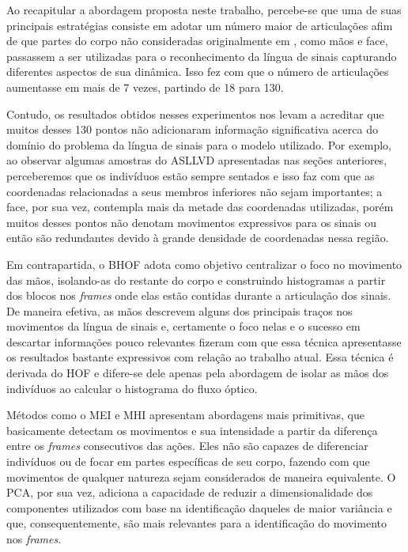 

Ao recapitular a abordagem proposta neste trabalho, percebe-se que uma de suas principais estratégias consiste em adotar um número maior de articulações afim de que partes do corpo não consideradas originalmente em \cite{st-gcn-2018}, como mãos e face, passassem a ser utilizadas para o reconhecimento da língua de sinais capturando diferentes aspectos de sua dinâmica. Isso fez com que o número de articulações aumentasse em mais de 7 vezes, partindo de 18 para 130. 

Contudo, os resultados obtidos nesses experimentos nos levam a acreditar que muitos desses 130 pontos não adicionaram informação significativa acerca do domínio do problema da língua de sinais para o modelo utilizado. Por exemplo, ao observar algumas amostras do ASLLVD apresentadas nas seções anteriores, perceberemos que os indivíduos estão sempre sentados e isso faz com que as coordenadas relacionadas a seus membros inferiores não sejam importantes; a face, por sua vez, contempla mais da metade das coordenadas utilizadas, porém muitos desses pontos não denotam movimentos expressivos para os sinais ou então são redundantes devido à grande densidade de coordenadas nessa região. 

Em contrapartida, o BHOF \cite{lim-2016} adota como objetivo centralizar o foco no movimento das mãos, isolando-as do restante do corpo e construindo histogramas a partir dos blocos nos \textit{frames} onde elas estão contidas durante a articulação dos sinais. De maneira efetiva, as mãos descrevem alguns dos principais traços nos movimentos da língua de sinais e, certamente o foco nelas e o sucesso em descartar informações pouco relevantes fizeram com que essa técnica apresentasse os resultados bastante expressivos com relação ao trabalho atual. Essa técnica é derivada do HOF e difere-se dele apenas pela abordagem de isolar as mãos dos indivíduos ao calcular o histograma do fluxo óptico.

Métodos como o MEI e MHI apresentam abordagens mais primitivas, que basicamente detectam os movimentos e sua intensidade a partir da diferença entre os \textit{frames} consecutivos das ações. Eles não são capazes de diferenciar indivíduos ou de focar em partes específicas de seu corpo, fazendo com que movimentos de qualquer natureza sejam considerados de maneira equivalente. O PCA, por sua vez, adiciona a capacidade de reduzir a dimensionalidade dos componentes utilizados com base na identificação daqueles de maior variância e que, consequentemente, são mais relevantes para a identificação do movimento nos \textit{frames}. 

